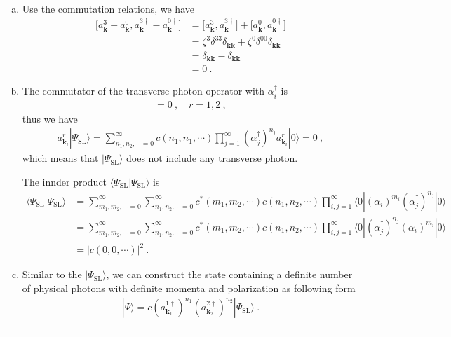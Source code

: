 \documentclass[12pt]{report}
\numberwithin{problemname}{chapter}
\newenvironment{solution}{\vspace{1em}\par\noindent{\large\textbf{\textsc{Solution}}}\par}{\vspace{1em}\hrule}
\begin{document}
\begin{solution}
\begin{enumerate}[(a)]
    \item Use the commutation relations, we have
    \begin{align}
        \bigg[a^3_{\mathbf{k}}-a^0_{\mathbf{k}},a^{3\dagger}_{\mathbf{k}}-a^{0\dagger}_{\mathbf{k}}\bigg]&=\bigg[a^3_{\mathbf{k}},a^{3\dagger}_{\mathbf{k}}\bigg]+\bigg[a^0_{\mathbf{k}},a^{0\dagger}_{\mathbf{k}}\bigg] \nonumber \\
        &=\zeta^3\delta^{33}\delta_{\mathbf{kk}}+\zeta^0\delta^{00}\delta_{\mathbf{kk}} \nonumber \\
        &=\delta_{\mathbf{kk}}-\delta_{\mathbf{kk}} \nonumber \\
        &=0\ .
    \end{align}
    \item The commutator of the transverse photon operator with $\alpha^{\dagger}_i$ is
    \begin{align}
        [a^{r}_{\mathbf{k}_i},\alpha^{\dagger}_j]=0\ ,\quad r=1,2\ ,
    \end{align}
    thus we have
    \begin{align}
        a^{r}_{\mathbf{k}_i}|\Psi_{\text{SL}}\rangle=\sum^{\infty}_{n_1,n_2,\cdots=0}c(n_1,n_1,\cdots)\prod_{j=1}^{\infty}(\alpha^{\dagger}_j)^{n_j}a^r_{\mathbf{k}_i}|0\rangle = 0\ ,
    \end{align}
    which means that $|\Psi_{\text{SL}}\rangle$ does not include any transverse photon. \par
    The innder product $\langle\Psi_{\text{SL}}|\Psi_{\text{SL}}\rangle$ is
    \begin{align}
        \langle\Psi_{\text{SL}}|\Psi_{\text{SL}}\rangle&=\sum^{\infty}_{m_1,m_2,\cdots=0}\sum^{\infty}_{n_1,n_2,\cdots=0}c^*(m_1,m_2,\cdots)c(n_1,n_2,\cdots)\prod_{i,j=1}^{\infty}\langle 0|(\alpha_i)^{m_i}(\alpha^{\dagger}_j)^{n_j}|0\rangle \nonumber \\
        &=\sum^{\infty}_{m_1,m_2,\cdots=0}\sum^{\infty}_{n_1,n_2,\cdots=0}c^*(m_1,m_2,\cdots)c(n_1,n_2,\cdots)\prod_{i,j=1}^{\infty}\langle 0|(\alpha^{\dagger}_j)^{n_j}(\alpha_i)^{m_i}|0\rangle \nonumber \\
        &=|c(0,0,\cdots)|^2\ .
    \end{align}
    \item Similar to the $|\Psi_{\text{SL}}\rangle$, we can construct the state containing a definite number of physical photons with definite momenta and polarization as following form
    \begin{align}
        |\Psi\rangle=c(a^{1\dagger}_{\mathbf{k}_1})^{n_1}(a^{2\dagger}_{\mathbf{k}_2})^{n_2}|\Psi_{\text{SL}}\rangle\ .
    \end{align}
\end{enumerate}
\end{solution}
\end{document}

